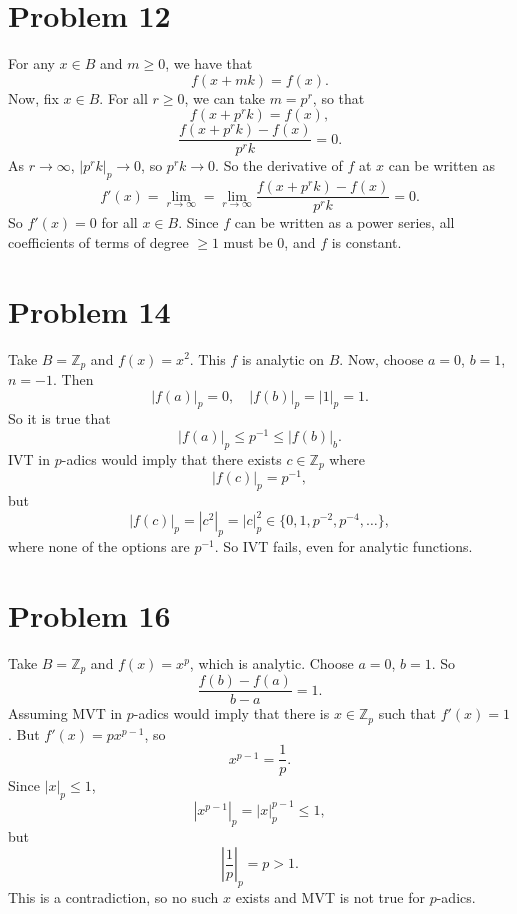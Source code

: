 \documentclass{article}
\newcommand{\Z}{\mathbb{Z}}
\newcommand{\bigabs}[1]{\left|#1\right|}
\begin{document}
\section*{Problem 12}
For any $x \in B$ and $m \ge 0$, we have that
$$f(x + mk) = f(x).$$
Now, fix $x \in B$. For all $r \ge 0$, we can take $m = p^r$, so that
$$f(x + p^rk) = f(x),$$
$$\frac{f(x + p^rk) - f(x)}{p^rk} = 0.$$
As $r \to \infty$, $|p^rk|_p \to 0$, so $p^rk \to 0$. So the derivative of $f$ at $x$ can be written as
$$f'(x) = \lim_{r \to \infty} = \lim_{r \to \infty} \frac{f(x + p^rk) - f(x)}{p^rk} = 0.$$
So $f'(x) = 0$ for all $x \in B$. Since $f$ can be written as a power series, all coefficients of terms of degree $\ge 1$ must be $0$, and $f$ is constant.

\section*{Problem 14}
Take $B = \Z_p$ and $f(x) = x^2$. This $f$ is analytic on $B$. Now, choose $a = 0$, $b = 1$, $n = -1$. Then
$$|f(a)|_p = 0, \quad |f(b)|_p = |1|_p = 1.$$
So it is true that
$$|f(a)|_p \le p^{-1} \le |f(b)|_b.$$
IVT in $p$-adics would imply that there exists $c \in \Z_p$ where
$$|f(c)|_p = p^{-1},$$
but
$$|f(c)|_p = |c^2|_p = |c|_p^2 \in \{0, 1, p^{-2}, p^{-4}, \ldots\},$$
where none of the options are $p^{-1}$. So IVT fails, even for analytic functions.

\section*{Problem 16}
Take $B = \Z_p$ and $f(x) = x^p$, which is analytic. Choose $a = 0$, $b = 1$. So
$$\frac{f(b) - f(a)}{b - a} = 1.$$
Assuming MVT in $p$-adics would imply that there is $x \in \Z_p$ such that $f'(x) = 1$. But $f'(x) = px^{p - 1}$, so
$$x^{p - 1} = \frac{1}{p}.$$
Since $|x|_p \le 1$,
$$|x^{p - 1}|_p = |x|_p^{p - 1} \le 1,$$
but
$$\bigabs{\frac{1}{p}}_p = p > 1.$$
This is a contradiction, so no such $x$ exists and MVT is not true for $p$-adics.
\end{document}
